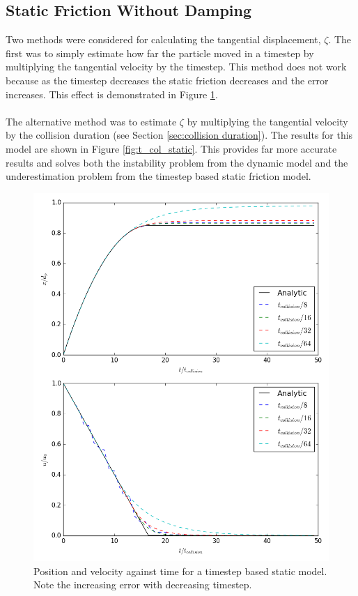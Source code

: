 \documentclass[a4paper,11pt,titlepage]{report}
\begin{document}
\subsection{Static Friction Without Damping}
Two methods were considered for calculating the tangential displacement, $\zeta$. The first was to simply estimate how far the particle moved in a timestep by multiplying the tangential velocity by the timestep. This method does not work because as the timestep decreases the static friction decreases and the error increases. This effect is demonstrated in Figure \ref{fig:delta_t_static}.
\\\\The alternative method was to estimate $\zeta$ by multiplying the tangential velocity by the collision duration (see Section \ref{sec:collision duration}). The results for this model are shown in Figure \ref{fig:t_col_static}. This provides far more accurate results and solves both the instability problem from the dynamic model and the underestimation problem from the timestep based static friction model.
\begin{figure}[!ht]
\centering
\includegraphics[scale=0.5]{figures/friction_model/delta_t_static.png}
\caption{Position and velocity against time for a timestep based static model. Note the increasing error with decreasing timestep.}
\label{fig:delta_t_static}
\end{figure}
\end{document}

